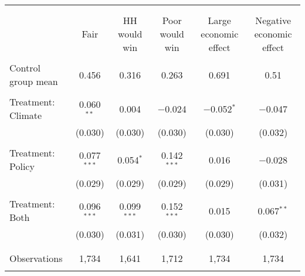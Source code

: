 
\begin{tabular}{@{\extracolsep{5pt}}lccccc} 
\\[-1.8ex]\hline 
\hline \\[-1.8ex] 
\\[-1.8ex] & Fair & HH would win & Poor would win & Large economic effect & Negative economic effect \\ 
\hline \\[-1.8ex] 
 Control group mean & 0.456 & 0.316 & 0.263 & 0.691 & 0.51  \\ \hline \\[-1.8ex] Treatment: Climate & 0.060$^{**}$ & 0.004 & $-$0.024 & $-$0.052$^{*}$ & $-$0.047 \\ 
  & (0.030) & (0.030) & (0.030) & (0.030) & (0.032) \\ 
  & & & & & \\ 
 Treatment: Policy & 0.077$^{***}$ & 0.054$^{*}$ & 0.142$^{***}$ & 0.016 & $-$0.028 \\ 
  & (0.029) & (0.029) & (0.029) & (0.029) & (0.031) \\ 
  & & & & & \\ 
 Treatment: Both & 0.096$^{***}$ & 0.099$^{***}$ & 0.152$^{***}$ & 0.015 & 0.067$^{**}$ \\ 
  & (0.030) & (0.031) & (0.030) & (0.030) & (0.032) \\ 
  & & & & & \\ 
\hline \\[-1.8ex] 

Observations & 1,734 & 1,641 & 1,712 & 1,734 & 1,734 \\ 
\hline 
\hline \\[-1.8ex] 
\end{tabular} 